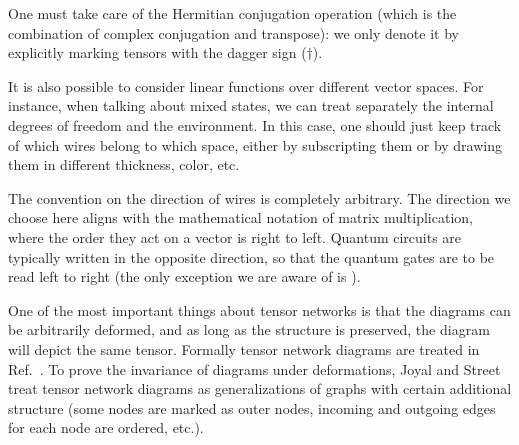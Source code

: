 







One must take care of the Hermitian conjugation operation (which is the combination of complex conjugation and transpose): we only denote it by explicitly marking tensors with the dagger sign ($\dagger$). 

It is also possible to consider linear functions over different vector spaces. For instance, when talking about mixed states, we can treat separately the internal degrees of freedom and the environment. In this case, one should just keep track of which wires belong to which space, either by subscripting them or by drawing them in different thickness, color, etc.

The convention on the direction of wires is completely arbitrary. The direction we choose here aligns with the mathematical notation of matrix multiplication, where the order they act on a vector is right to left. Quantum circuits are typically written in the opposite direction, so that the quantum gates are to be read left to right (the only exception we are aware of is \cite{kitaev_classical_2002}).

One of the most important things about tensor networks is that the diagrams can be arbitrarily deformed, and as long as the structure is preserved, the diagram will depict the same tensor. Formally tensor network diagrams are treated in Ref.~\cite{joyal_geometry_1991}. To prove the invariance of diagrams under deformations, Joyal and Street treat tensor network diagrams as generalizations of graphs with certain additional structure (some nodes are marked as outer nodes, incoming and outgoing edges for each node are ordered, etc.).

